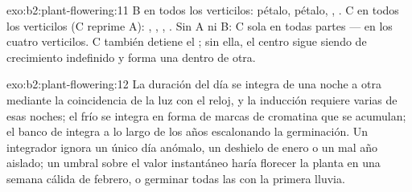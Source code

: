 \begin{solution}{exo:b2:plant-flowering:11}
B en todos los verticilos: pétalo, pétalo, , . C en todos
los verticilos (C reprime A): , , , . Sin A
ni B: C sola en todas partes ---  en los cuatro verticilos. C
también detiene el ; sin ella, el centro sigue siendo de
crecimiento indefinido y forma una  dentro de otra.
\end{solution}

\begin{solution}{exo:b2:plant-flowering:12}
La duración del día se integra de una noche a otra mediante la
coincidencia de la luz con el reloj, y la inducción requiere varias de
esas noches; el frío se integra en forma de marcas de cromatina que se
acumulan; el banco de  integra a lo largo de los años
escalonando la germinación. Un integrador ignora un único día anómalo, un
deshielo de enero o un mal año aislado; un umbral sobre el valor
instantáneo haría florecer la planta en una semana cálida de febrero, o
germinar todas las  con la primera lluvia.
\end{solution}

